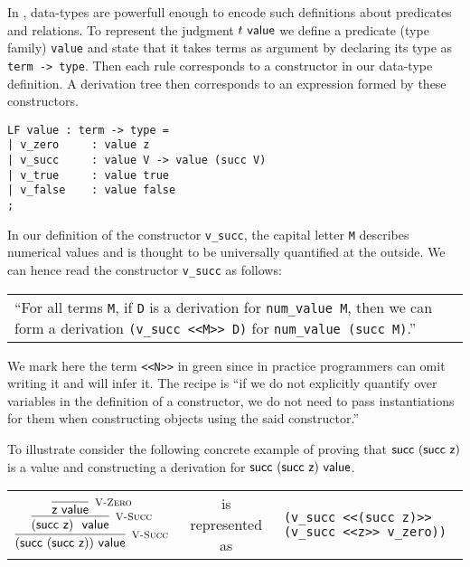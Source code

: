In \beluga, data-types are powerfull enough to encode such definitions
about  predicates  and  relations.  To represent the judgment  $t ~\mathsf{value}$  we
define  a predicate (type family) \lstinline!value!  and state that it takes
terms as argument  by declaring its type as \lstinline!term -> type!.  Then each
rule corresponds to a constructor in our data-type definition. A derivation tree
then corresponds to an expression formed by these constructors.

\begin{lstlisting}
LF value : term -> type =
| v_zero     : value z
| v_succ     : value V -> value (succ V)
| v_true     : value true
| v_false    : value false
;
\end{lstlisting}

In our definition  of  the constructor \lstinline!v_succ!, the  capital  letter
\lstinline!M! describes numerical values and is thought  to be  universally
quantified  at the outside.  We can hence read the constructor \lstinline!v_succ! as follows:

\begin{center}
\begin{tabular}{p{12cm}}
``For  all  terms   \lstinline$M$,   if   \lstinline!D!  is  a  derivation   for
\lstinline!num_value M!,      then      we     can     form     a     derivation
\lstinline!(v_succ <<M>> D)! for \lstinline!num_value (succ M)!.''
\end{tabular}
\end{center}


We mark here  the term \lstinline!<<N>>! in green  since in practice programmers
can omit  writing it  and \beluga  will infer it.  The recipe is  ``if we do not
explicitly quantify over variables in the definition of a constructor, we do not
need  to pass instantiations  for them when constructing objects  using the said
constructor.''


To illustrate consider the following concrete example of proving that
$\textsf{succ}~(\textsf{succ}~\textsf{z})$ is a value and constructing a derivation
for $\textsf{succ}~(\textsf{succ}~\textsf{z}) ~\mathsf{value}$. %
\begin{center}
\begin{tabular}{l@{~~}c@{}l}
$
\infer[\VSucc]
  { (\tmsucc (\tmsucc \tmzero)) \Value }
  { \infer[\VSucc]
      { (\tmsucc \tmzero)~\Value }
      { \infer[\VZero]
          {\tmzero \Value}
          {}
      }
  }
$ & 
is represented as &
{\small{
\lstinline!(v_succ <<(succ z)>> (v_succ <<z>> v_zero))!}}
\end{tabular}  
\end{center}

